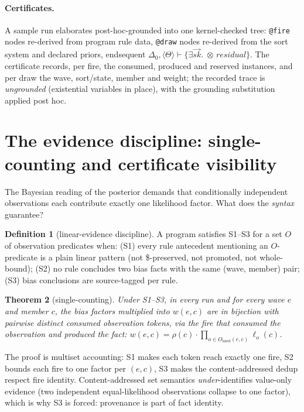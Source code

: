 \documentclass[11pt]{article}
\newcommand{\tensor}{\otimes}
\newcommand{\trz}[1]{\langle #1\rangle}
\newcommand{\Tr}{\Theta}
\newtheorem{theorem}{Theorem}[section]
\theoremstyle{definition}
\newtheorem{definition}[theorem]{Definition}
\theoremstyle{remark}
\begin{document}
\paragraph{Certificates.}  A sample run elaborates post-hoc-grounded
into one kernel-checked tree: \texttt{@fire} nodes re-derived from
program rule data, \texttt{@draw} nodes re-derived from the sort system
and declared priors, endsequent
$\Delta_0,\trz{\Tr} \vdash \{\exists\vec{sk}.\;\tensor\,residual\}$.
The certificate records, per fire, the consumed, produced and reserved
instances, and per draw the wave, sort/state, member and weight; the
recorded trace is \emph{ungrounded} (existential variables in place),
with the grounding substitution applied post hoc.

\section{The evidence discipline: single-counting and certificate
  visibility}
\label{sec:evidence}

The Bayesian reading of the posterior demands that conditionally
independent observations each contribute exactly one likelihood factor.
What does the \emph{syntax} guarantee?

\begin{definition}[linear-evidence discipline]
A program satisfies S1--S3 for a set $O$ of observation predicates
when: (S1) every rule antecedent mentioning an $O$-predicate is a plain
linear pattern (not \$-preserved, not promoted, not whole-bound); (S2)
no rule concludes two bias facts with the same (wave, member) pair;
(S3) bias conclusions are source-tagged per rule.
\end{definition}

\begin{theorem}[single-counting]
\label{thm:single}
Under S1--S3, in every run and for every wave $e$ and member $c$, the
bias factors multiplied into $w(e,c)$ are in bijection with pairwise
distinct consumed observation tokens, via the fire that consumed the
observation and produced the fact:
$w(e,c) = \rho(c)\cdot\prod_{o\in O_{\mathrm{used}}(e,c)} \ell_o(c)$.
\end{theorem}

The proof is multiset accounting: S1 makes each token reach exactly one
fire, S2 bounds each fire to one factor per $(e,c)$, S3 makes the
content-addressed dedup respect fire identity.  Content-addressed set
semantics \emph{under}-identifies value-only evidence (two independent
equal-likelihood observations collapse to one factor), which is why S3
is forced: provenance is part of fact identity.
\end{document}
